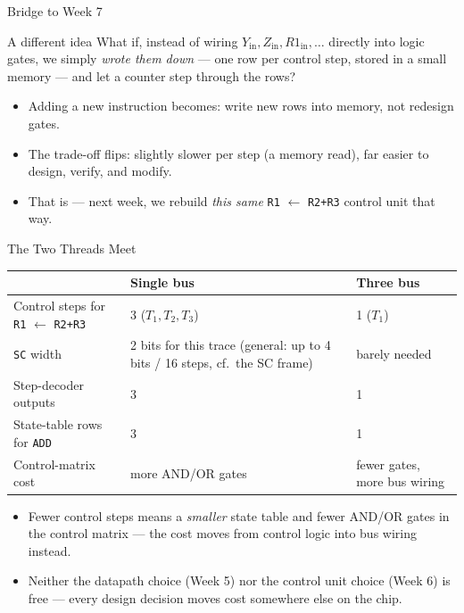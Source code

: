 \documentclass[aspectratio=169]{beamer}
\begin{document}
\begin{frame}{Bridge to Week 7}
  \begin{exampleblock}{A different idea}
    What if, instead of wiring $Y_{\text{in}}, Z_{\text{in}}, R1_{\text{in}}, \dots$ directly
    into logic gates, we simply \emph{wrote them down} --- one row per control
    step, stored in a small memory --- and let a counter step through the rows?
  \end{exampleblock}
  \begin{itemize}
    \item Adding a new instruction becomes: write new rows into memory, not
      redesign gates.
    \item The trade-off flips: slightly slower per step (a memory read), far
      easier to design, verify, and modify.
    \item That is  --- next week, we rebuild
      \emph{this same} \texttt{R1} $\gets$ \texttt{R2+R3} control unit that way.
  \end{itemize}
\end{frame}

\begin{frame}{The Two Threads Meet}
  \begin{center}
    \small
    \begin{tabular}{@{}p{3.4cm}p{4.6cm}p{4.6cm}@{}}
      \toprule
      & \textbf{Single bus} & \textbf{Three bus} \\
      \midrule
      Control steps for \texttt{R1} $\gets$ \texttt{R2+R3} & 3 ($T_1,T_2,T_3$) & 1 ($T_1$) \\
      \texttt{SC} width & 2 bits for this trace (general: up to 4 bits / 16 steps, cf.\ the SC frame) & barely needed \\
      Step-decoder outputs & 3 & 1 \\
      State-table rows for \texttt{ADD} & 3 & 1 \\
      Control-matrix cost & more AND/OR gates & fewer gates, more bus wiring \\
      \bottomrule
    \end{tabular}
  \end{center}
  \begin{itemize}
    \item Fewer control steps means a \emph{smaller} state table and fewer AND/OR
      gates in the control matrix --- the cost moves from control logic into bus
      wiring instead.
    \item Neither the datapath choice (Week 5) nor the control unit choice
      (Week 6) is free --- every design decision moves cost somewhere else on the
      chip.
  \end{itemize}
\end{frame}
\end{document}
